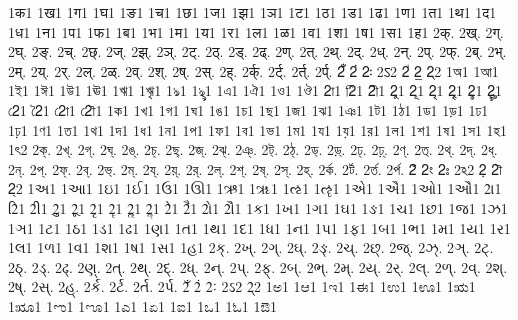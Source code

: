 {1क1
1ख1
1ग1
1घ1
1ङ1
1च1
1छ1
1ज1
1झ1
1ञ1
1ट1
1ठ1
1ड1
1ढ1
1ण1
1त1
1थ1
1द1
1ध1
1न1
1प1
1फ1
1ब1
1भ1
1म1
1य1
1र1
1ल1
1ळ1
1व1
1श1
1ष1
1स1
1ह1
2क्.
2ख्.
2ग्.
2घ्.
2ङ्.
2च्.
2छ्.
2ज्.
2झ्.
2ञ्.
2ट्.
2ठ्.
2ड्.
2ढ्.
2ण्.
2त्.
2थ्.
2द्.
2ध्.
2न्.
2प्.
2फ्.
2ब्.
2भ्.
2म्.
2य्.
2र्.
2ल्.
2ळ्.
2व्.
2श्.
2ष्.
2स्.
2ह्.
2र्क्.
2र्ट्.
2र्त्.
2र्प्.
2ँ
2ं
2ः
2ऽ2
2॑
2॒
2्2
1অ1
1আ1
1ই1
1ঈ1
1উ1
1ঊ1
1ঋ1
1ৠ1
1ঌ1
1ৡ1
1এ1
1ঐ1
1ও1
1ঔ1
2া1
2ি1
2ী1
2ু1
2ূ1
2ৃ1
2ৄ1
2ৢ1
2ৣ1
2ে1
2ৈ1
2ো1
2ৌ1
1ক1
1খ1
1গ1
1ঘ1
1ঙ1
1চ1
1ছ1
1জ1
1ঝ1
1ঞ1
1ট1
1ঠ1
1ড1
1ড়1
1ঢ1
1ঢ়1
1ণ1
1ত1
1থ1
1দ1
1ধ1
1ন1
1প1
1ফ1
1ব1
1ভ1
1ম1
1য1
1য়1
1র1
1ল1
1শ1
1ষ1
1স1
1হ1
1ৎ2
2ক্.
2খ্.
2গ্.
2ঘ্.
2ঙ্.
2চ্.
2ছ্.
2জ্.
2ঝ্.
2ঞ্.
2ট্.
2ঠ্.
2ড্.
2ড়্.
2ঢ্.
2ঢ়্.
2ণ্.
2ত্.
2থ্.
2দ্.
2ধ্.
2ন্.
2প্.
2ফ্.
2ব্.
2ভ্.
2ম্.
2য্.
2য়্.
2র্.
2ল্.
2শ্.
2ষ্.
2স্.
2হ্.
2র্ক.
2র্ট.
2র্ত.
2র্প.
2ঁ
2ং
2ঃ
2ঽ2
2়
2ৗ
2্2
1અ1
1આ1
1ઇ1
1ઈ1
1ઉ1
1ઊ1
1ઋ1
1ૠ1
1ઌ1
1ૡ1
1એ1
1ઐ1
1ઓ1
1ઔ1
2ા1
2િ1
2ી1
2ુ1
2ૂ1
2ૃ1
2ૄ1
2ૢ1
2ૣ1
2ે1
2ૈ1
2ો1
2ૌ1
1ક1
1ખ1
1ગ1
1ઘ1
1ઙ1
1ચ1
1છ1
1જ1
1ઝ1
1ઞ1
1ટ1
1ઠ1
1ડ1
1ઢ1
1ણ1
1ત1
1થ1
1દ1
1ધ1
1ન1
1પ1
1ફ1
1બ1
1ભ1
1મ1
1ય1
1ર1
1લ1
1ળ1
1વ1
1શ1
1ષ1
1સ1
1હ1
2ક્.
2ખ્.
2ગ્.
2ઘ્.
2ઙ્.
2ચ્.
2છ્.
2જ્.
2ઝ્.
2ઞ્.
2ટ્.
2ઠ્.
2ડ્.
2ઢ્.
2ણ્.
2ત્.
2થ્.
2દ્.
2ધ્.
2ન્.
2પ્.
2ફ્.
2બ્.
2ભ્.
2મ્.
2ય્.
2ર્.
2લ્.
2ળ્.
2વ્.
2શ્.
2ષ્.
2સ્.
2હ્.
2ર્ક.
2ર્ટ.
2ર્ત.
2ર્પ.
2ઁ
2ં
2ઃ
2ઽ2
2્2
1ಅ1
1ಆ1
1ಇ1
1ಈ1
1ಉ1
1ಊ1
1ಋ1
1ೠ1
1ಌ1
1ೡ1
1ಎ1
1ಏ1
1ಐ1
1ಒ1
1ಓ1
1ಔ1
}
